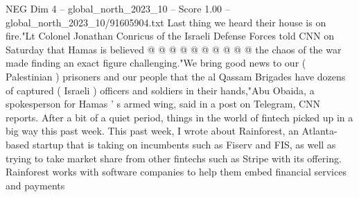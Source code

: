 \begin{textsample}{NEG Dim 4 – global\_north\_2023\_10 – Score 1.00 – global\_north\_2023\_10/91605904.txt}
Last thing we heard their house is on fire."Lt Colonel Jonathan Conricus of the Israeli Defense Forces told CNN on Saturday that Hamas is believed @ @ @ @ @ @ @ @ @ @ the chaos of the war made finding an exact figure challenging."We bring good news to our ( Palestinian ) prisoners and our people that the al Qassam Brigades have dozens of captured ( Israeli ) officers and soldiers in their hands,"Abu Obaida, a spokesperson for Hamas ' s armed wing, said in a post on Telegram, CNN reports.
After a bit of a quiet period, things in the world of fintech picked up in a big way this past week.
This past week, I wrote about Rainforest, an Atlanta-based startup that is taking on incumbents such as Fiserv and FIS, as well as trying to take market share from other fintechs such as Stripe with its offering.
Rainforest works with software companies to help them embed financial services and payments

\end{textsample}
